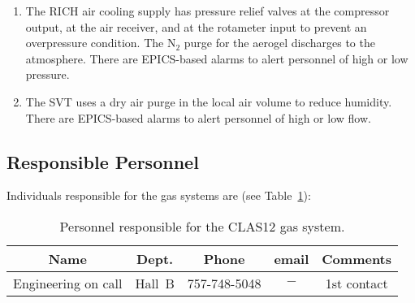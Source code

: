 \begin{enumerate}
\item The RICH air cooling supply has pressure relief valves at the compressor output, at the 
air receiver, and at the rotameter input to prevent an overpressure condition. The N$_2$ purge 
for the aerogel discharges to the atmosphere. There are EPICS-based alarms to alert personnel 
of high or low pressure.

\item The SVT uses a dry air purge in the local air volume to reduce humidity. There are 
EPICS-based alarms to alert personnel of high or low flow.
\end{enumerate}

\subsection{Responsible Personnel}

Individuals responsible for the gas systems are (see Table~\ref{tb:gas}):

\begin{table}[!htb]
\centering
\begin{tabular}{|c|c|c|c|c|} \hline
Name & Dept. & Phone & email & Comments \\ \hline
Engineering on call & Hall~B & 757-748-5048 & $-$ & 1st contact \\ \hline
\end{tabular}
\caption{Personnel responsible for the CLAS12 gas system.} 
\label{tb:gas}
\end{table}


